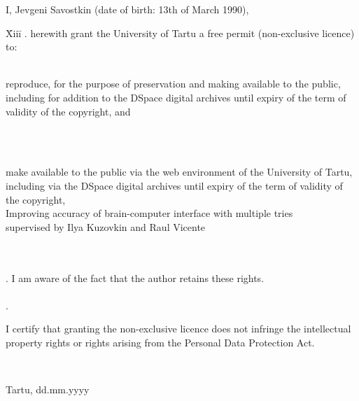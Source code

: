\documentclass[12pt]{article}
\begin{document}
I, Jevgeni Savostkin (date of birth: 13th of March 1990),

\begin{tabbing}
\= Xiii\=\kill
{}. \> herewith grant the University of Tartu a free permit (non-exclusive licence) to:\\\\ 

\> 
\begin{minipage}[t]{14.2cm}
reproduce, for the purpose of preservation and making available to the public, including for addition to the DSpace digital archives until expiry of the term of validity of the copyright, and
\end{minipage}
\\\\
\begin{minipage}[t]{14.2cm}
make available to the public via the web environment of the University of Tartu, including via the DSpace digital archives until expiry of the term of validity of the copyright,\\ 

Improving accuracy of brain-computer interface with multiple tries\\   

supervised by Ilya Kuzovkin and Raul Vicente

\end{minipage}\\\\ 
. \>I am aware of the fact that the author retains these rights.\\\\
. \>
\begin{minipage}[t]{14.2cm}
I certify that granting the non-exclusive licence does not infringe the intellectual property rights or rights arising from the Personal Data Protection Act. 
\end{minipage}\\
\end{tabbing}

\noindent
Tartu, dd.mm.yyyy
\end{document}
